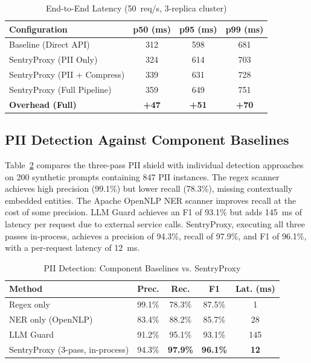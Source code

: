 \documentclass[conference]{IEEEtran}
\begin{document}
\begin{table}[htbp]
\caption{End-to-End Latency (50~req/s, 3-replica cluster)}
\begin{center}
\begin{tabular}{|l|c|c|c|}
\hline
\textbf{Configuration} & \textbf{p50 (ms)} & \textbf{p95 (ms)} & \textbf{p99 (ms)} \\
\hline
Baseline (Direct API)              & 312 & 598 & 681 \\
SentryProxy (PII Only)             & 324 & 614 & 703 \\
SentryProxy (PII + Compress)       & 339 & 631 & 728 \\
SentryProxy (Full Pipeline)        & 359 & 649 & 751 \\
\hline
\textbf{Overhead (Full)}       & \textbf{+47} & \textbf{+51} & \textbf{+70} \\
\hline
\end{tabular}
\label{tab:latency}
\end{center}
\end{table}

\subsection{PII Detection Against Component Baselines}
Table~\ref{tab:pii} compares the three-pass PII shield with individual detection approaches on 200 synthetic prompts containing 847 PII instances. The regex scanner achieves high precision (99.1\%) but lower recall (78.3\%), missing contextually embedded entities. The Apache OpenNLP NER scanner improves recall at the cost of some precision. LLM Guard achieves an F1 of 93.1\% but adds 145~ms of latency per request due to external service calls. SentryProxy, executing all three passes in-process, achieves a precision of 94.3\%, recall of 97.9\%, and F1 of 96.1\%, with a per-request latency of 12~ms.

\begin{table}[htbp]
\caption{PII Detection: Component Baselines vs. SentryProxy}
\begin{center}
\begin{tabular}{|l|c|c|c|c|}
\hline
\textbf{Method} & \textbf{Prec.} & \textbf{Rec.} & \textbf{F1} & \textbf{Lat. (ms)} \\
\hline
Regex only                        & 99.1\% & 78.3\% & 87.5\% & 1   \\
NER only (OpenNLP)                & 83.4\% & 88.2\% & 85.7\% & 28  \\
LLM Guard \cite{b_llmguard}       & 91.2\% & 95.1\% & 93.1\% & 145 \\
SentryProxy (3-pass, in-process)  & 94.3\% & \textbf{97.9\%} & \textbf{96.1\%} & \textbf{12}  \\
\hline
\end{tabular}
\label{tab:pii}
\end{center}
\end{table}
\end{document}
